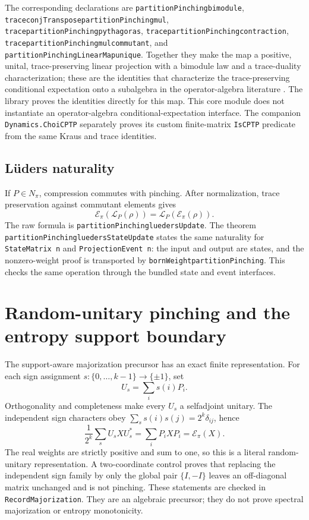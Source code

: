 \documentclass[11pt]{article}
\renewcommand{\_}{\textunderscore\allowbreak}
\theoremstyle{remark}
\newcommand{\pinch}{\mathcal E}
\newcommand{\lued}{\mathcal L}
\begin{document}
{\raggedright
The corresponding declarations are
\texttt{partitionPinching\_bimodule},
\texttt{trace\_conjTranspose\_partitionPinching\_mul},
\texttt{trace\_partitionPinching\_pythagoras},
\texttt{trace\_partitionPinching\_contraction},
\texttt{trace\_partitionPinching\_mul\_commutant}, and
\texttt{partitionPinchingLinearMap\_unique}. Together they make the map a
positive, unital, trace-preserving linear projection with a bimodule law and
a trace-duality characterization; these are the identities that
characterize the trace-preserving conditional expectation onto a subalgebra
in the operator-algebra literature \cite{umegaki1954,takesaki1972}. The
library proves the identities directly for this map. This core module does
not instantiate an operator-algebra conditional-expectation interface. The
companion \texttt{Dynamics.ChoiCPTP} separately proves its custom
finite-matrix \texttt{IsCPTP} predicate from the same Kraus and trace
identities.\par}


\subsection{L\"uders naturality}

If $P\in N_\pi$, compression commutes with pinching. After normalization,
trace preservation against commutant elements gives
\[
 \pinch_\pi(\lued_P(\rho))=
 \lued_P(\pinch_\pi(\rho)).
\]
The raw formula is
\texttt{partitionPinching\_luedersUpdate}. The theorem
\texttt{partitionPinching\_luedersStateUpdate} states the same naturality for
\texttt{StateMatrix n} and \texttt{ProjectionEvent n}: the input and output
are states, and the nonzero-weight proof is transported by
\texttt{bornWeight\_partitionPinching}. This checks the same operation through
the bundled state and event interfaces.

\section{Random-unitary pinching and the entropy support boundary}
\label{sec:spectral-boundary}

The support-aware majorization precursor has an exact finite representation. For
each sign assignment \(s:\{0,\ldots,k-1\}\to\{\pm1\}\), set
\[
 U_s=\sum_i s(i)P_i .
\]
Orthogonality and completeness make every \(U_s\) a selfadjoint unitary. The
independent sign characters obey
\(\sum_s s(i)s(j)=2^k\delta_{ij}\), hence
\[
 \frac1{2^k}\sum_s U_s X U_s^*=\sum_iP_iXP_i=\pinch_\pi(X).
\]
The real weights are strictly positive and sum to one, so this is a literal
random-unitary representation. A two-coordinate control proves that replacing
the independent sign family by only the global pair \(\{I,-I\}\) leaves an
off-diagonal matrix unchanged and is not pinching. These statements are
checked in \texttt{RecordMajorization}. They are an algebraic precursor;
they do not prove spectral majorization or entropy monotonicity.
\end{document}
